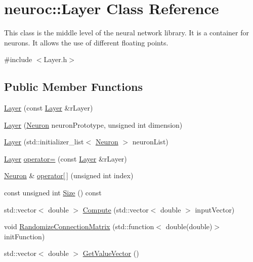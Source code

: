 \hypertarget{classneuroc_1_1_layer}{\section{neuroc\-:\-:Layer Class Reference}
\label{classneuroc_1_1_layer}
}


This class is the middle level of the neural network library. It is a container for neurons. It allows the use of different floating points.  




{\ttfamily \#include $<$Layer.\-h$>$}

\subsection*{Public Member Functions}
\begin{DoxyCompactItemize}
\item 
\hyperlink{classneuroc_1_1_layer_af6c8e29004e6da131d5b22e475c0e92a}{Layer} (const \hyperlink{classneuroc_1_1_layer}{Layer} \&r\-Layer)
\item 
\hyperlink{classneuroc_1_1_layer_a3be19d5c1aaabb35cba0e07b33913ba9}{Layer} (\hyperlink{classneuroc_1_1_neuron}{Neuron} neuron\-Prototype, unsigned int dimension)
\item 
\hyperlink{classneuroc_1_1_layer_ab033a91582f5f6b7db961d516d2e7f7e}{Layer} (std\-::initializer\-\_\-list$<$ \hyperlink{classneuroc_1_1_neuron}{Neuron} $>$ neuron\-List)
\item 
\hyperlink{classneuroc_1_1_layer}{Layer} \hyperlink{classneuroc_1_1_layer_aa198f0235496dadff15a8b80bfa564d6}{operator=} (const \hyperlink{classneuroc_1_1_layer}{Layer} \&r\-Layer)
\item 
\hyperlink{classneuroc_1_1_neuron}{Neuron} \& \hyperlink{classneuroc_1_1_layer_ae82161250ed86f8965d239449c87d734}{operator\mbox{[}$\,$\mbox{]}} (unsigned int index)
\item 
const unsigned int \hyperlink{classneuroc_1_1_layer_aa80735d22f8f35c5ec35e059677ab733}{Size} () const 
\item 
std\-::vector$<$ double $>$ \hyperlink{classneuroc_1_1_layer_a4d879665e9fd0738fea6a5200c70296a}{Compute} (std\-::vector$<$ double $>$ input\-Vector)
\item 
void \hyperlink{classneuroc_1_1_layer_ac00e3384d6e22bf87b4359c43cb4461e}{Randomize\-Connection\-Matrix} (std\-::function$<$ double(double)$>$ init\-Function)
\item 
std\-::vector$<$ double $>$ \hyperlink{classneuroc_1_1_layer_a14fd8d60709fbe79059574b090f9531a}{Get\-Value\-Vector} ()

\end{DoxyCompactItemize}
